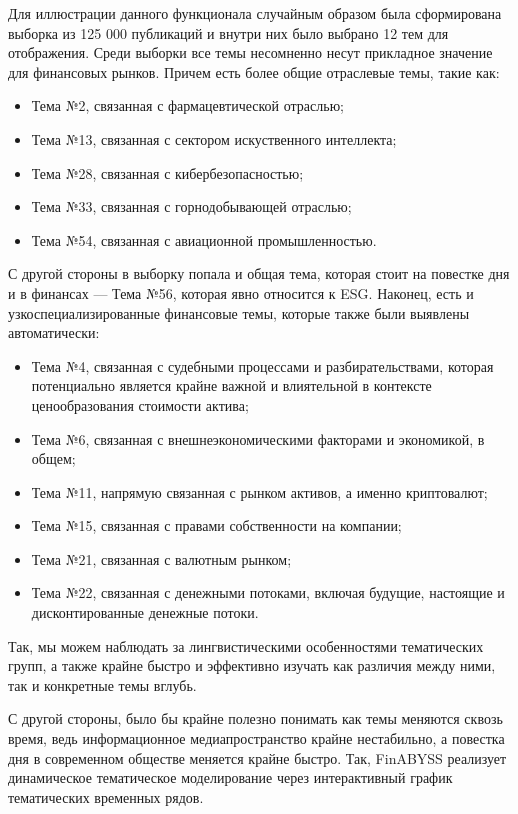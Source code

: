 Для иллюстрации данного функционала случайным образом была сформирована выборка из
125 000 публикаций и внутри них было выбрано 12 тем для отображения. Среди выборки
все темы несомненно несут прикладное значение для финансовых рынков. Причем есть
более общие отраслевые темы, такие как:

\begin{itemize}
    \item Тема №2, связанная с фармацевтической отраслью;
    \item Тема №13, связанная с сектором искуственного интеллекта;
    \item Тема №28, связанная с кибербезопасностью;
    \item Тема №33, связанная с горнодобывающей отраслью;
    \item Тема №54, связанная с авиационной промышленностью.
\end{itemize}

С другой стороны в выборку попала и общая тема, которая стоит на повестке дня и в финансах ---
Тема №56, которая явно относится к ESG. Наконец, есть и узкоспециализированные финансовые темы,
которые также были выявлены автоматически:

\begin{itemize}
    \item Тема №4, связанная с судебными процессами и разбирательствами, которая потенциально
    является крайне важной и влиятельной в контексте ценообразования стоимости актива;
    \item Тема №6, связанная с внешнеэкономическими факторами и экономикой, в общем;
    \item Тема №11, напрямую связанная с рынком активов, а именно криптовалют;
    \item Тема №15, связанная с правами собственности на компании;
    \item Тема №21, связанная с валютным рынком;
    \item Тема №22, связанная с денежными потоками, включая будущие, настоящие и дисконтированные денежные потоки.
\end{itemize}

Так, мы можем наблюдать за лингвистическими особенностями тематических групп,
а также крайне быстро и эффективно изучать как различия между ними, так и конкретные темы вглубь.

С другой стороны, было бы крайне полезно понимать как темы меняются сквозь время, ведь информационное медиапространство
крайне нестабильно, а повестка дня в современном обществе меняется крайне быстро. Так, FinABYSS реализует
динамическое тематическое моделирование через интерактивный график тематических временных рядов.

